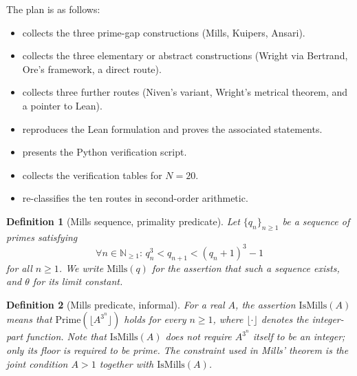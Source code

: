 \documentclass[11pt,reqno]{amsart}
\theoremstyle{redplain}
\newtheorem{definition}{Definition}[section]
\numberwithin{equation}{section}
\begin{document}
\noindent The plan is as follows:

\begin{itemize}
\item {} collects the three prime-gap constructions
(Mills, Kuipers, Ansari).

\item {} collects the three elementary or abstract
constructions (Wright via Bertrand, Ore's framework, a direct route).

\item {} collects three further routes (Niven's variant,
Wright's metrical theorem, and a pointer to Lean).

\item {} reproduces the Lean formulation and proves the
associated statements.

\item {} presents the Python verification script.

\item {} collects the verification tables for $N=20$.

\item {} re-classifies the ten routes in second-order
arithmetic.
\end{itemize}

\begin{definition}[Mills sequence, primality predicate]
\label{def:mills-seq} Let $\{q_{n}\}_{n\geq 1}$ be a sequence of primes
satisfying 
\begin{equation}
\forall n\in 
\mathbb{N}
_{\geq 1}\text{: \ \ \ }q_{n}^{3}<q_{n+1}<(q_{n}+1)^{3}-1
\end{equation}
for all $n\geq 1$. We write $\mathrm{Mills}(q)$ for the assertion that such
a sequence exists, and $\theta $ for its limit constant.
\end{definition}

\begin{definition}[Mills predicate, informal]
\label{def:ismills-intro} For a real $A$, the assertion $\mathrm{IsMills}(A)$
means that $\mathrm{Prime}(\lfloor A^{3^n}\rfloor)$ holds for every $n\ge1$,
where $\lfloor\cdot\rfloor$ denotes the integer-part function. Note that $%
\mathrm{IsMills}(A)$ does \emph{not} require $A^{3^n}$ itself to be an
integer; only its floor is required to be prime. The constraint used in
Mills' theorem is the joint condition $A>1$ together with $\mathrm{IsMills}%
(A)$.
\end{definition}
\end{document}
